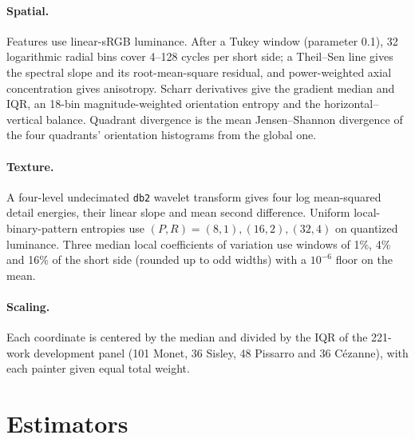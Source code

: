 \paragraph{Spatial.} Features use linear-sRGB luminance. After a Tukey window (parameter 0.1),
32 logarithmic radial bins cover 4--128 cycles per short side; a Theil--Sen line gives the
spectral slope and its root-mean-square residual, and power-weighted axial concentration gives
anisotropy. Scharr derivatives give the gradient median and IQR, an 18-bin magnitude-weighted
orientation entropy and the horizontal--vertical balance. Quadrant divergence is the mean
Jensen--Shannon divergence of the four quadrants' orientation histograms from the global one.

\paragraph{Texture.} A four-level undecimated \texttt{db2} wavelet transform
\citep{mallat1989wavelet} gives four log mean-squared detail energies, their linear slope and
mean second difference. Uniform local-binary-pattern entropies \citep{ojala2002lbp} use
$(P,R)=(8,1),(16,2),(32,4)$ on quantized luminance. Three median local coefficients of
variation use windows of 1\%, 4\% and 16\% of the short side (rounded up to odd widths) with a
$10^{-6}$ floor on the mean.

\paragraph{Scaling.} Each coordinate is centered by the median and divided by the IQR of the
221-work development panel (101 Monet, 36 Sisley, 48 Pissarro and 36 C\'ezanne), with each
painter given equal total weight.

\FloatBarrier
\section{Estimators}\label{app:estimators}

